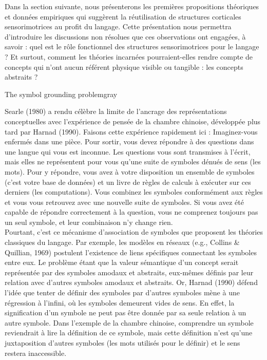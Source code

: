 \documentclass[
  a4paper,12pt,twoside,onecolumn,openright,final,oldfontcommands]{memoir}
\newcommand\chaptercolor{gray}
\begin{document}
Dans la section suivante, nous présenterons les premières propositions théoriques et données empiriques qui suggèrent la réutilisation de structures corticales sensorimotrices au profit du langage. Cette présentation nous permettra d'introduire les discussions non résolues que ces observations ont engagées, à savoir : quel est le rôle fonctionnel des structures sensorimotrices pour le langage ? Et surtout, comment les théories incarnées pourraient-elles rendre compte de concepts qui n'ont aucun référent physique visible ou tangible : les concepts abstraits ?

\vspace{2mm}

\begin{mybox}[label=symbol]{The symbol grounding problem}{\chaptercolor}

Searle (1980) a rendu célèbre la limite de l’ancrage des représentations conceptuelles avec l’expérience de pensée de la chambre chinoise, développée plus tard par Harnad (1990). Faisons cette expérience rapidement ici : Imaginez-vous enfermés dans une pièce. Pour sortir, vous devez répondre à des questions dans une langue qui vous est inconnue. Les questions vous sont transmises à l’écrit, mais elles ne représentent pour vous qu’une suite de symboles dénués de sens (les mots). Pour y répondre, vous avez à votre disposition un ensemble de symboles (c’est votre base de données) et un livre de règles de calculs à exécuter sur ces derniers (les computations). Vous combinez les symboles conformément aux règles et vous vous retrouvez avec une nouvelle suite de symboles. Si vous avez été capable de répondre correctement à la question, vous ne comprenez toujours pas un seul symbole, et leur combinaison n’y change rien.\\

Pourtant, c’est ce mécanisme d’association de symboles que proposent les théories classiques du langage. Par exemple, les modèles en réseaux (e.g., Collins \& Quillian, 1969) postulent l’existence de liens spécifiques connectant les symboles entre eux. Le problème étant que la valeur sémantique d’un concept serait représentée par des symboles amodaux et abstraits, eux-mêmes définis par leur relation avec d’autres symboles amodaux et abstraits. Or, Harnad (1990) défend l’idée que tenter de définir des symboles par d’autres symboles mène à une régression à l’infini, où les symboles demeurent vides de sens. En effet, la signification d’un symbole ne peut pas être donnée par sa seule relation à un autre symbole. Dans l’exemple de la chambre chinoise, comprendre un symbole reviendrait à lire la définition de ce symbole, mais cette définition n’est qu’une juxtaposition d’autres symboles (les mots utilisés pour le définir) et le sens restera inaccessible.\\


\end{mybox}
\end{document}
